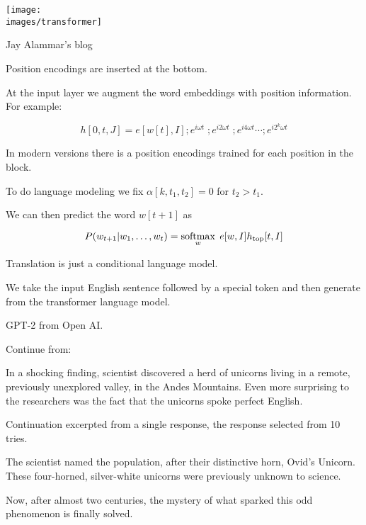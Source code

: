 {

\centerline{\texttt{[image: \\images/transformer]}}

{\huge
\centerline{Jay Alammar's blog}
}

Position encodings are inserted at the bottom.


At the input layer we augment the word embeddings with position information. For example:

\vfill
{\color{red} $$h[0,t,J] = e[w[t],I];e^{i\omega t}\;;e^{i2\omega t}\;;e^{i4\omega t}\cdots;e^{i2^k\omega t}$$}

\vfill
In modern versions there is a position encodings trained for each position in the block.


To do language modeling we fix $\alpha[k,t_1,t_2] = 0$ for $t_2 > t_1$.

\vfill
We can then predict the word $w[t+1]$ as

\vfill
$$P(w_{t+1}|w_1,\ldots,w_t) = \operatorname*{softmax}_w\;e[w,I]h_\mathrm{top}[t,I]$$


Translation is just a conditional language model.

\vfill
We take the input English sentence followed by a special token and then generate from the transformer language model.



GPT-2 from Open AI.

\vfill
{\color{red} Continue from:}

\vfill
In a shocking finding, scientist discovered a herd of unicorns living in a remote, previously unexplored valley, in the Andes Mountains. Even more surprising to the researchers was the fact that the unicorns spoke perfect English.


{\color{red} Continuation excerpted from a single response, the response selected from 10 tries.}

\bigskip

The scientist named the population, after their distinctive horn, Ovid’s Unicorn. These four-horned, silver-white unicorns were previously unknown to science.

Now, after almost two centuries, the mystery of what sparked this odd phenomenon is finally solved.

}
